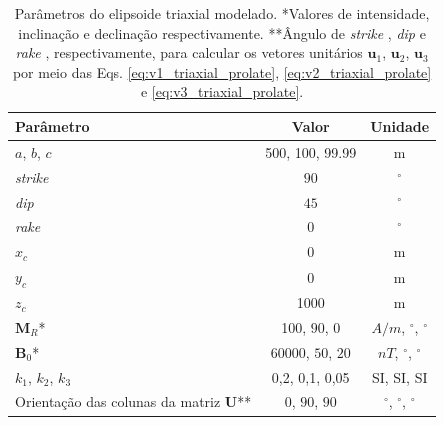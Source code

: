 \begin{table}[h!]
	\begin{center}
		\begin{tabular}{|l|c|c|}
			\hline
			\textbf{Parâmetro}  & \textbf{Valor}  & \textbf{Unidade} \\
			\hline 
			$a$, $b$, $c$  & 500, 100, 99.99 & m\\
			\hline
			\textit{strike}   & $90$ & $^{\circ}$\\
			\hline
			\textit{dip}    & $45$ & $^{\circ}$\\
			\hline
			\textit{rake}   & $0$  & $^{\circ}$\\
			\hline
			$x_c$   & 0 & m \\
			\hline          
			$y_c$   & 0  & m\\
			\hline                
			$z_c$   & 1000  & m\\
			\hline
			$\mathbf{M}_{R}$*  & 100, $90$, $0$  & $A/m$, $^{\circ}$, $^{\circ}$\\
			\hline
			$\mathbf{B}_{0}$*    & 60000, $50$, $20$ & $nT$, $^{\circ}$, $^{\circ}$\\
			\hline
			$k_{1}$, $k_{2}$, $k_{3}$   & 0,2, 0,1, 0,05  & SI, SI, SI\\
			\hline
			Orientação das colunas da matriz $\mathbf{U}$**   & $0$, $90$, $90$  & $^{\circ}$, $^{\circ}$, $^{\circ}$\\
			\hline
		\end{tabular}
		\caption{Parâmetros do elipsoide triaxial modelado. *Valores de intensidade, inclinação e declinação respectivamente. **Ângulo de \textit{strike} , \textit{dip}  e \textit{rake} , respectivamente, para calcular os vetores unitários $\mathbf{u}_{1}$, $\mathbf{u}_{2}$, $\mathbf{u}_{3}$ por meio das Eqs. \ref{eq:v1_triaxial_prolate}, \ref{eq:v2_triaxial_prolate} e \ref{eq:v3_triaxial_prolate}.}
	\end{center}
	\label{tab:triaxial_prolate1}
\end{table}

\vspace{2cm}

